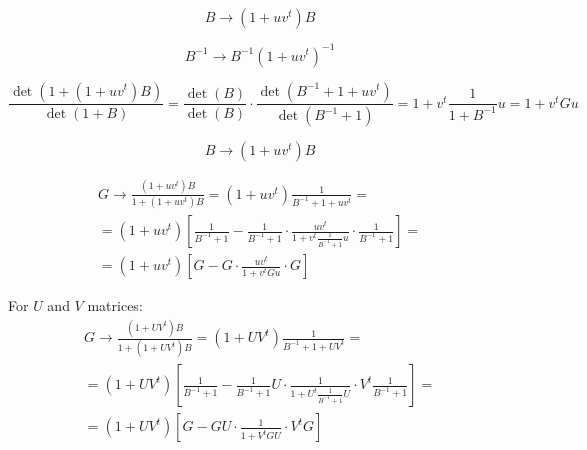 \documentclass[onecolumn,english,prl,showpacs]{revtex4}
\begin{document}
\begin{equation}
 B \rightarrow (1+uv^t)B
\end{equation}

\begin{equation}
 B^{-1} \rightarrow B^{-1}(1+uv^t)^{-1}
\end{equation}

\begin{equation}
 \frac{\det(1+(1+uv^t)B)}{\det(1+B)} = \frac{\det(B)}{\det(B)}\cdot \frac{\det(B^{-1}+1+uv^t)}{\det(B^{-1}+1)} = 1+v^t\frac{1}{1+B^{-1}} u = 1+v^t G u
\end{equation}

\begin{equation}
 B \rightarrow (1+uv^t)B
\end{equation}

\begin{multline}
 G \rightarrow \frac{(1+uv^t)B}{1+(1+uv^t)B} = (1+uv^t)\frac{1}{B^{-1}+1+uv^t} =\\= (1+uv^t)\left[\frac{1}{B^{-1}+1}-\frac{1}{B^{-1}+1}\cdot\frac{uv^t}{1+v^t\frac{1}{B^{-1}+1}u}\cdot\frac{1}{B^{-1}+1}\right]=\\= (1+uv^t)\left[G-G\cdot\frac{uv^t}{1+v^tGu}\cdot G\right]
\end{multline}

For $U$ and $V$ matrices:
\begin{multline}
 G \rightarrow \frac{(1+UV^t)B}{1+(1+UV^t)B} = (1+UV^t)\frac{1}{B^{-1}+1+UV^t} =\\= (1+UV^t)\left[\frac{1}{B^{-1}+1}-\frac{1}{B^{-1}+1}U\cdot\frac{1}{1+U^t\frac{1}{B^{-1}+1}U}\cdot V^t\frac{1}{B^{-1}+1}\right]=\\= (1+UV^t)\left[G-GU\cdot\frac{1}{1+V^tGU}\cdot V^tG\right]
\end{multline}
\end{document}
